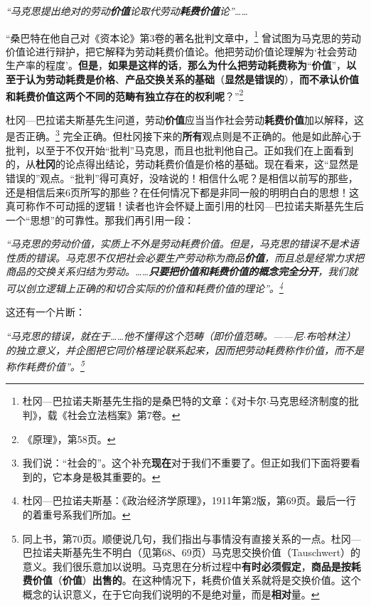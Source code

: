 \documentclass[fontset=fandol, a4paper, 12pt, openright]{ctexbook}
\renewenvironment{quote}
  {\list{}{\rightmargin\leftmargin}%
   \item\relax\small\itshape\color{darkgray}}
  {\endlist}
\begin{document}
\begin{quote}
“马克思提出绝对的劳动\textbf{价值}论取代劳动\textbf{耗费价值}论”……

“桑巴特在他自己对《资本论》第3卷的著名批判文章中，\footnote{杜冈—巴拉诺夫斯基先生指的是桑巴特的文章：《对卡尔$\cdot$马克思经济制度的批判》，载《社会立法档案》第7卷。} 曾试图为马克思的劳动价值论进行辩护，把它解释为劳动耗费价值论。他把劳动价值论理解为‘社会劳动生产率的程度’。\textbf{但是}，\textbf{如果是这样的话}，\textbf{那么为什么把劳动耗费称为}“\textbf{价值}”，\textbf{以至于认为劳动耗费是价格}、\textbf{产品交换关系的基础}（\textbf{显然是错误的}），\textbf{而不承认价值和耗费价值这两个不同的范畴有独立存在的权利呢}？”\footnote{《原理》，第58页。}
\end{quote}

杜冈—巴拉诺夫斯基先生问道，劳动\textbf{价值}应当当作社会劳动\textbf{耗费价值}加以解释，这是否正确。\footnote{我们说：“社会的”。这个补充\textbf{现在}对于我们不重要了。但正如我们下面将要看到的，它本身是极其重要的。} 完全正确。但杜冈接下来的\textbf{所有}观点则是不正确的。他是如此醉心于批判，以至于不仅开始“批判”马克思，而且也批判他自己。正如我们在上面看到的，从\textbf{杜冈}的论点得出结论，劳动耗费价值是价格的基础。现在看来，这“显然是错误的”观点。“批判”得可真好，没啥说的！相信什么呢？是相信以前写的那些，还是相信后来6页所写的那些？在任何情况下都是非同一般的明明白白的思想！这真可称作不可动摇的逻辑！读者也许会怀疑上面引用的杜冈—巴拉诺夫斯基先生后一个“思想”的可靠性。那我们再引用一段：

\begin{quote}
“马克思的劳动价值，实质上不外是劳动耗费价值。但是，马克思的错误不是术语性质的错误。马克思不仅把社会必要生产劳动称为商品\textbf{价值}，而且总是经常力求把商品的交换关系归结为劳动。……\textbf{只要把价值和耗费价值的概念完全分开}，我们就可以创立逻辑上正确的和切合实际的价值和耗费价值的理论”。\footnote{杜冈—巴拉诺夫斯基：《政治经济学原理》，1911年第2版，第69页。最后一行的着重号系我们所加。}
\end{quote}

这还有一个片断：

\begin{quote}
“马克思的错误，就在于……他不懂得这个范畴（即价值范畴。——尼$\cdot$布哈林注）的独立意义，并企图把它同价格理论联系起来，因而把劳动耗费称作价值，而不是称作耗费价值”。\footnote{同上书，第70页。顺便说几句，我们指出与事情没有直接关系的一点。杜冈—巴拉诺夫斯基先生不明白（见第68、69页）马克思交换价值（Tauschwert）的意义。我们很乐意加以说明。马克思在分析过程中\textbf{有时必须假定}，\textbf{商品是按耗费价值}（\textbf{价值}）\textbf{出售的}。在这种情况下，耗费价值关系就将是交换价值。这个概念的认识意义，在于它向我们说明的不是绝对量，而是\textbf{相对}量。}
\end{quote}
\end{document}
